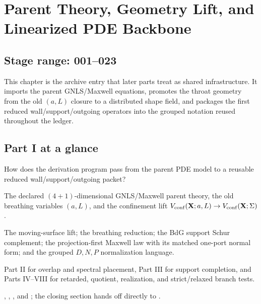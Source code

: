 
\chapter{Parent Theory, Geometry Lift, and Linearized PDE Backbone}
\label{chap:part01_parent_geometry}

\section*{Stage range: 001--023}

This chapter is the archive entry that later parts treat as shared infrastructure.  It imports the parent GNLS/Maxwell equations, promotes the throat geometry from the old \((a,L)\) closure to a distributed shape field, and packages the first reduced wall/support/outgoing operators into the grouped notation reused throughout the ledger.

\section*{Part I at a glance}

\begin{readermap}
\item[Primary question] How does the derivation program pass from the parent PDE model to a reusable reduced wall/support/outgoing packet?
\item[Starting inputs] The declared \((4+1)\)-dimensional GNLS/Maxwell parent theory, the old breathing variables \((a,L)\), and the confinement lift \(V_{\rm conf}(\mathbf X;a,L)\to V_{\rm conf}(\mathbf X;\Sigma)\).
\item[Delivers] The moving-surface lift; the breathing reduction; the BdG support Schur complement; the projection-first Maxwell law with its matched one-port normal form; and the grouped \(D,N,P\) normalization language.
\item[Used by] Part II for overlap and spectral placement, Part III for support completion, and Parts IV--VIII for retarded, quotient, realization, and strict/relaxed branch tests.
\item[Result anchors] , , , and ; the closing section hands off directly to .
\end{readermap}

